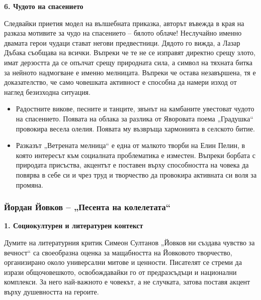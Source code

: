 \documentclass[12pt,a4paper]{article}
\begin{document}
\vspace{-0.2cm}
\noindent
\textbf{6. Чудото на спасението} 
\vspace{0.1cm}

\indent Следвайки приетия модел на вълшебната приказка, авторът въвежда в края на разказа мотивите за чудо на спасението – бялото облаче! Неслучайно именно двамата герои чудаци стават негови предвестници. Дядото го вижда, а Лазар Дъбака съобщава на всички. Въпреки че те не се изправят директно срещу злото, имат дерзостта да се опълчат срещу природната сила, а символ на тяхната битка за нейното надмогване е именно мелницата. Въпреки че остава незавършена, тя е доказателство, че само човешката активност е способна да намери изход от наглед безизходна ситуация.

\begin{itemize}[leftmargin=*]
\vspace{-0.2cm}
\item Радостните викове, песните и танците, звънът на камбаните увестоват чудото на спасението. Появата на облака за разлика от Яворовата поема „Градушка“ провокира весела олелия. Появата му възвръща хармонията в селското битие.
\end{itemize}

\begin{itemize}[leftmargin=*]
\vspace{-0.6cm}
\item Разказът „Ветрената мелница“ е една от малкото творби на Елин Пелин, в която интересът към социалната проблематика е изместен. Въпреки борбата с природата присъства, акцентът е поставен върху способността на човека да повярва в себе си и чрез труд и творчество да провокира активната си воля за промяна.
\end{itemize}

\newpage

\subsubsection{\colorbox{green!40}{Йордан Йовков – „Песента на колелетата“}}
\textbf{1. Социокултурен и литературен контекст}
\vspace{0.1cm} 

\indent Думите на литературния критик Симеон Султанов „Йовков ни създава чувство за вечност“ са своеобразна оценка за мащабността на Йовковото творчество, организирано около универсални митове и ценности. Писателят се стреми да изрази общочовешкото, освобождавайки го от предразсъдъци и национални комплекси. За него най-важното е човекът, а не случката, затова поставя акцент върху душевността на героите.
\end{document}
